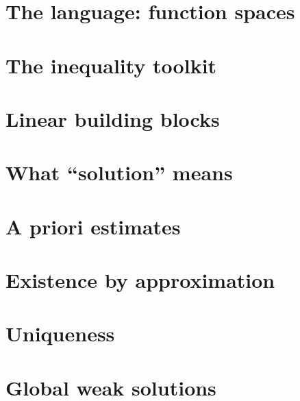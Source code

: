 \documentclass[11pt,openany]{book}
\begin{document}
\chapter{The language: function spaces}




\chapter{The inequality toolkit}





\chapter{Linear building blocks}




\chapter{What ``solution'' means}


\chapter{A priori estimates}


\chapter{Existence by approximation}


\chapter{Uniqueness}


\chapter{Global weak solutions}



\end{document}
